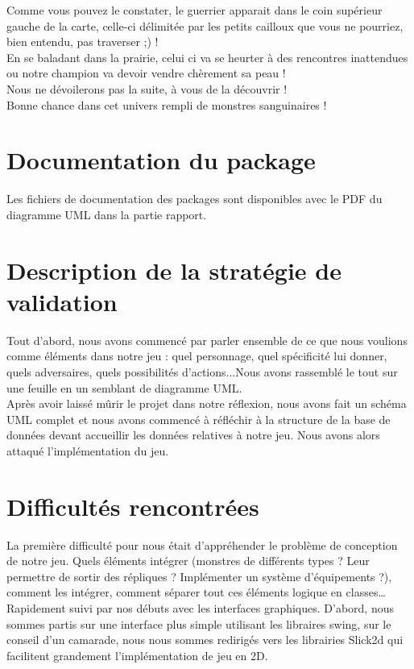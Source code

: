 \documentclass[a4paper,titlepage]{article}
\begin{document}
	Comme vous pouvez le constater, le guerrier apparait dans le coin supérieur gauche de la carte, celle-ci délimitée par les petits cailloux que vous ne pourriez, bien entendu, pas traverser ;) !\\
	
	En se baladant dans la prairie, celui ci va se heurter à des rencontres inattendues ou notre champion va devoir vendre chèrement sa peau !\\
	
	Nous ne dévoilerons pas la suite, à vous de la découvrir !\\
	
	Bonne chance dans cet univers rempli de monstres sanguinaires !
		
	\section{Documentation du package}
	Les fichiers de documentation des packages sont disponibles avec le PDF du diagramme UML dans la partie rapport.

	\section{Description de la stratégie de validation}
	Tout d’abord, nous avons commencé par parler ensemble de ce que nous voulions comme éléments dans notre jeu : quel personnage, quel spécificité lui donner, quels adversaires, quels possibilités d’actions...Nous avons rassemblé le tout sur une feuille en un semblant de diagramme UML.\\

Après avoir laissé mûrir le projet dans notre réflexion, nous avons fait un schéma UML complet et nous avons commencé à réfléchir à la structure de la base de données devant accueillir les données relatives à notre jeu. Nous avons alors attaqué l’implémentation du jeu.	
\clearpage
	
	\section{Difficultés rencontrées}
	La première difficulté pour nous était d’appréhender le problème de conception de notre jeu. Quels éléments intégrer (monstres de différents types ? Leur permettre de sortir des répliques ? Implémenter un système d’équipements ?), comment les intégrer, comment séparer tout ces éléments logique en classes…\\
	
Rapidement suivi par nos débuts avec les interfaces graphiques. D’abord, nous sommes partis sur une interface plus simple utilisant les libraires swing, sur le conseil d’un camarade, nous nous sommes redirigés vers les librairies Slick2d qui facilitent grandement l’implémentation de jeu en 2D.\\
\end{document}
